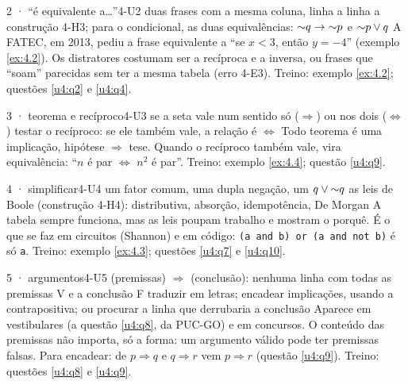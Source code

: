 \begin{caso}{2 · \enquote{é equivalente a\ldots}}{4-U2}
{duas frases com a mesma coluna, linha a linha}
{a construção 4-H3; para o condicional, as duas equivalências: ${{\sim}}q\rightarrow{{\sim}}p$ e ${{\sim}}p\vee q$}
\reconhecer A FATEC, em 2013, pediu a frase equivalente a \enquote{se $x<3$, então $y=-4$} (exemplo \ref{ex:4.2}). Os distratores costumam ser a recíproca e a inversa, ou frases que \enquote{soam} parecidas sem ter a mesma tabela (erro 4-E3). Treino: exemplo \ref{ex:4.2}; questões \ref{u4:q2} e \ref{u4:q4}.
\end{caso}

\begin{caso}{3 · teorema e recíproco}{4-U3}
{se a seta vale num sentido só ($\Rightarrow$) ou nos dois ($\Leftrightarrow$)}
{testar o recíproco: se ele também vale, a relação é $\Leftrightarrow$}
\reconhecer Todo teorema é uma implicação, hipótese $\Rightarrow$ tese. Quando o recíproco também vale, vira equivalência: \enquote{$n$ é par $\Leftrightarrow$ $n^2$ é par}. Treino: exemplo \ref{ex:4.4}; questão \ref{u4:q9}.
\end{caso}

\begin{caso}{4 · simplificar}{4-U4}
{um fator comum, uma dupla negação, um $q\vee{{\sim}}q$}
{as leis de Boole (construção 4-H4): distributiva, absorção, idempotência, De Morgan}
\reconhecer A tabela sempre funciona, mas as leis poupam trabalho e mostram o porquê. É o que se faz em circuitos (Shannon) e em código: \texttt{(a and b) or (a and not b)} é só \texttt{a}. Treino: exemplo \ref{ex:4.3}; questões \ref{u4:q7} e \ref{u4:q10}.
\end{caso}

\begin{caso}{5 · argumentos}{4-U5}
{(premissas) $\Rightarrow$ (conclusão): nenhuma linha com todas as premissas V e a conclusão F}
{traduzir em letras; encadear implicações, usando a contrapositiva; ou procurar a linha que derrubaria a conclusão}
\reconhecer Aparece em vestibulares (a questão \ref{u4:q8}, da PUC-GO) e em concursos. O conteúdo das premissas não importa, só a forma: um argumento válido pode ter premissas falsas. Para encadear: de $p\Rightarrow q$ e $q\Rightarrow r$ vem $p\Rightarrow r$ (questão \ref{u4:q9}). Treino: questões \ref{u4:q8} e \ref{u4:q9}.
\end{caso}

